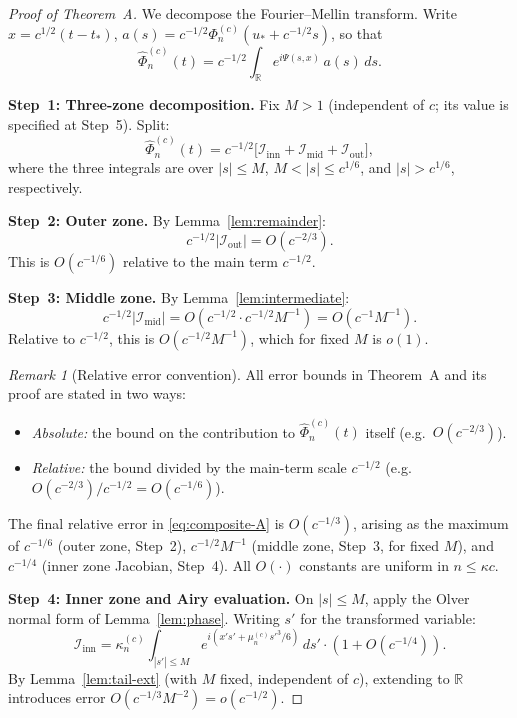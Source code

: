 \documentclass[12pt,a4paper]{amsart}
\theoremstyle{definition}
\theoremstyle{remark}
\newtheorem{remark}[theorem]{Remark}
\newcommand{\ustar}{u_*}
\newcommand{\tstar}{t_*}
\begin{document}
\begin{proof}[Proof of Theorem~A]
We decompose the Fourier--Mellin transform.
Write $x = c^{1/2}(t - \tstar)$,
$a(s) = c^{-1/2}\Phi_n^{(c)}(\ustar + c^{-1/2}s)$,
so that
\[
  \widehat{\Phi}_n^{(c)}(t)
  = c^{-1/2}\int_{\mathbb{R}}
    e^{i\Psi(s,x)}\,a(s)\,ds.
\]

\medskip
\noindent\textbf{Step~1: Three-zone decomposition.}
Fix $M > 1$ (independent of $c$; its value is specified
at Step~5).
Split:
\[
  \widehat{\Phi}_n^{(c)}(t)
  = c^{-1/2}\bigl[
    \mathcal{I}_{\mathrm{inn}}
    + \mathcal{I}_{\mathrm{mid}}
    + \mathcal{I}_{\mathrm{out}}
  \bigr],
\]
where the three integrals are over
$|s| \le M$, $M < |s| \le c^{1/6}$,
and $|s| > c^{1/6}$, respectively.

\medskip
\noindent\textbf{Step~2: Outer zone.}
By Lemma~\ref{lem:remainder}:
\[
  c^{-1/2}|\mathcal{I}_{\mathrm{out}}|
  = O(c^{-2/3}).
\]
This is $O(c^{-1/6})$ relative to the main term $c^{-1/2}$.

\medskip
\noindent\textbf{Step~3: Middle zone.}
By Lemma~\ref{lem:intermediate}:
\[
  c^{-1/2}|\mathcal{I}_{\mathrm{mid}}|
  = O(c^{-1/2} \cdot c^{-1/2}M^{-1})
  = O(c^{-1}M^{-1}).
\]
Relative to $c^{-1/2}$, this is $O(c^{-1/2}M^{-1})$,
which for fixed $M$ is $o(1)$.

\begin{remark}[Relative error convention]
\label{rem:relative-error}
All error bounds in Theorem~A and its proof are
stated in two ways:
\begin{itemize}
\item \emph{Absolute:} the bound on the contribution
  to $\widehat{\Phi}_n^{(c)}(t)$ itself
  (e.g.\ $O(c^{-2/3})$).
\item \emph{Relative:} the bound divided by the
  main-term scale $c^{-1/2}$
  (e.g.\ $O(c^{-2/3})/c^{-1/2} = O(c^{-1/6})$).
\end{itemize}
The final relative error in \eqref{eq:composite-A}
is $O(c^{-1/3})$, arising as the maximum of
$c^{-1/6}$ (outer zone, Step~2),
$c^{-1/2}M^{-1}$ (middle zone, Step~3, for fixed $M$),
and $c^{-1/4}$ (inner zone Jacobian, Step~4).
All $O(\cdot)$ constants are uniform in $n \le \kappa c$.
\end{remark}

\medskip
\noindent\textbf{Step~4: Inner zone and Airy evaluation.}
On $|s| \le M$,
apply the Olver normal form of Lemma~\ref{lem:phase}.
Writing $s'$ for the transformed variable:
\[
  \mathcal{I}_{\mathrm{inn}}
  = \kappa_n^{(c)}
    \int_{|s'| \le M}
    e^{i(x's' + \mu_n^{(c)}s'^3/6)}\,ds'
    \cdot(1 + O(c^{-1/4})).
\]
By Lemma~\ref{lem:tail-ext} (with $M$ fixed,
independent of $c$), extending to $\mathbb{R}$
introduces error $O(c^{-1/3}M^{-2}) = o(c^{-1/2})$.


\end{proof}
\end{document}
